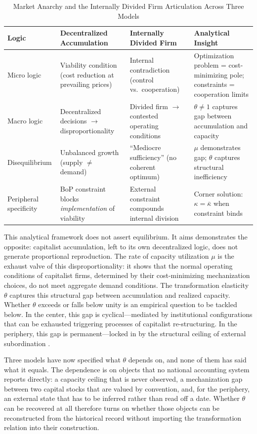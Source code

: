 \begin{table}[H]
	\centering
	\footnotesize
	\caption{Market Anarchy and the Internally Divided Firm Articulation Across Three Models}
	\label{tab:coherence}
	\begin{tabular}{p{2.2cm}p{3.8cm}p{3.8cm}p{4.2cm}}
		\toprule
		Logic & Decentralized Accumulation &
		Internally Divided Firm & Analytical Insight \\
		\midrule
		\midrule
		Micro logic & Viability condition (cost
		reduction at prevailing prices) & Internal
		contradiction (control vs.\ cooperation) &
		Optimization problem = cost-minimizing pole;
		constraints = cooperation limits \\
		Macro logic & Decentralized decisions $\to$
		disproportionality & Divided firm $\to$
		contested operating conditions & $\theta \neq 1$
		captures gap between accumulation and capacity \\
		Disequilibrium & Unbalanced growth (supply
		$\neq$ demand) & ``Mediocre sufficiency''
		\citep{Vidal2022} (no coherent optimum) & $\mu$
		demonstrates gap; $\theta$ captures structural
		inefficiency \\
		Peripheral specificity & BoP constraint blocks
		\textit{implementation} of viability & External
		constraint compounds internal division & Corner
		solution: $\kappa = \bar{\kappa}$ when
		constraint binds \\
		\bottomrule
	\end{tabular}
\end{table}

This analytical framework does not assert equilibrium. It aims 
demonstrates the opposite: capitalist accumulation,
left to its own decentralized logic, does not generate
proportional reproduction. The rate of capacity utilization 
$\mu$ is the exhaust valve of this
disproportionality: it shows that the normal operating
conditions of capitalist firms, determined by their
cost-minimizing mechanization choices, do not meet
aggregate demand conditions. The transformation elasticity
$\theta$ captures this structural gap between accumulation
and realized capacity. Whether $\theta$ exceeds or falls
below unity is an empirical question to be tackled below. In the center, this gap is cyclical---mediated by institutional configurations that
can be exhausted triggering processes of capitalist re-structuring. In the periphery, this gap is permanent---locked in by the structural ceiling of
external subordination \citep{Kaldor1959,Prebisch1981}.

Three models have now specified what $\theta$ depends on, and none of
them has said what it equals. The dependence is on objects that no
national accounting system reports directly: a capacity ceiling that is
never observed, a mechanization gap between two capital stocks that are
valued by convention, and, for the periphery, an external state that has
to be inferred rather than read off a date. Whether $\theta$ can be
recovered at all therefore turns on whether those objects can be
reconstructed from the historical record without importing the
transformation relation into their construction.
